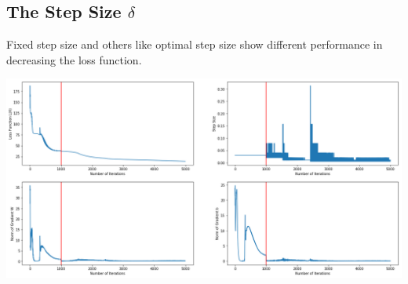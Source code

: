 \subsection{The Step Size $\delta$}

Fixed step size and others like optimal step size show different performance in decreasing the loss function.
\begin{center}
\includegraphics[width=\textwidth]{figures/pcNN_a2.png}
\end{center}
